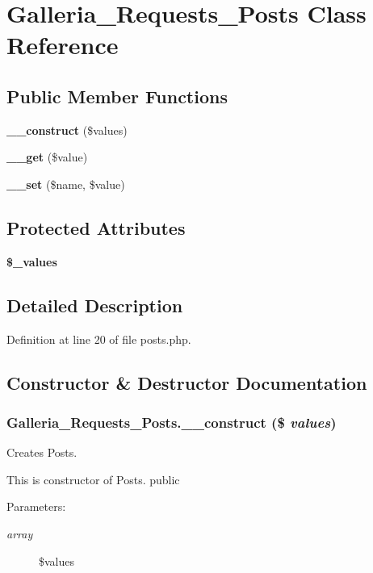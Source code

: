 \section{Galleria\_\-Requests\_\-Posts Class Reference}
\label{classGalleria__Requests__Posts}
\subsection*{Public Member Functions}
\begin{CompactItemize}
\item 
{\bf \_\-\_\-construct} (\$values)
\item 
{\bf \_\-\_\-get} (\$value)
\item 
{\bf \_\-\_\-set} (\$name, \$value)
\end{CompactItemize}
\subsection*{Protected Attributes}
\begin{CompactItemize}
\item 
{\bf \$\_\-values}
\end{CompactItemize}


\subsection{Detailed Description}


Definition at line 20 of file posts.php.

\subsection{Constructor \& Destructor Documentation}
\subsubsection{\setlength{\rightskip}{0pt plus 5cm}Galleria\_\-Requests\_\-Posts.\_\-\_\-construct (\$ {\em values})}\label{classGalleria__Requests__Posts_f62f543837abcce7230e1ea7a5834500}


Creates Posts.

This is constructor of Posts.  public \begin{Desc}
\item[Parameters:]
\begin{description}
\item[{\em array}]\$values \end{description}
\end{Desc}


